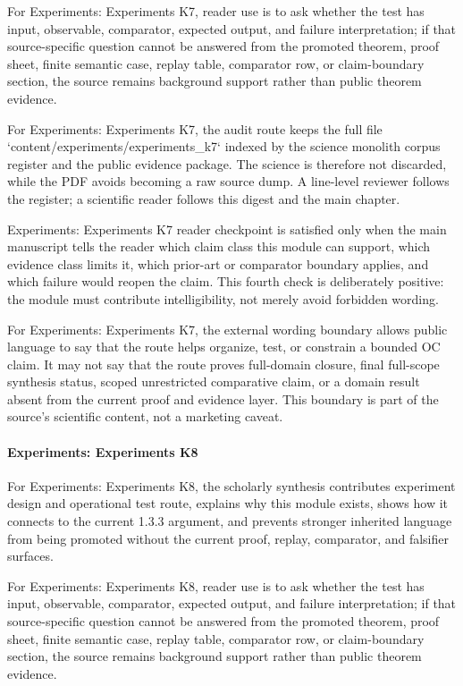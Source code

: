 For Experiments: Experiments K7, reader use is to ask whether the test has input, observable, comparator, expected output, and failure interpretation; if that source-specific question cannot be answered from the promoted theorem, proof sheet, finite semantic case, replay table, comparator row, or claim-boundary section, the source remains background support rather than public theorem evidence.


For Experiments: Experiments K7, the audit route keeps the full file `content/experiments/experiments\_k7` indexed by the science monolith corpus register and the public evidence package. The science is therefore not discarded, while the PDF avoids becoming a raw source dump. A line-level reviewer follows the register; a scientific reader follows this digest and the main chapter.


Experiments: Experiments K7 reader checkpoint is satisfied only when the main manuscript tells the reader which claim class this module can support, which evidence class limits it, which prior-art or comparator boundary applies, and which failure would reopen the claim. This fourth check is deliberately positive: the module must contribute intelligibility, not merely avoid forbidden wording.


For Experiments: Experiments K7, the external wording boundary allows public language to say that the route helps organize, test, or constrain a bounded OC claim. It may not say that the route proves full-domain closure, final full-scope synthesis status, scoped unrestricted comparative claim, or a domain result absent from the current proof and evidence layer. This boundary is part of the source's scientific content, not a marketing caveat.


\paragraph{Experiments: Experiments K8}

For Experiments: Experiments K8, the scholarly synthesis contributes experiment design and operational test route, explains why this module exists, shows how it connects to the current 1.3.3 argument, and prevents stronger inherited language from being promoted without the current proof, replay, comparator, and falsifier surfaces.


For Experiments: Experiments K8, reader use is to ask whether the test has input, observable, comparator, expected output, and failure interpretation; if that source-specific question cannot be answered from the promoted theorem, proof sheet, finite semantic case, replay table, comparator row, or claim-boundary section, the source remains background support rather than public theorem evidence.


